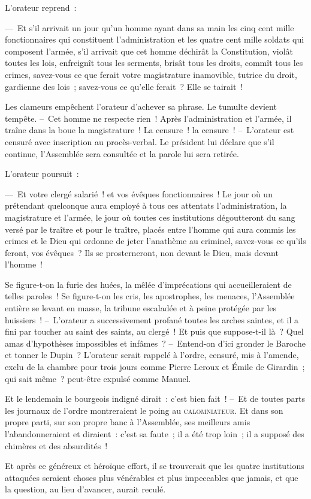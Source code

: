 \documentclass[french,twoside]{book} %
\begin{document}
L’orateur reprend :\par
— Et s’il arrivait un jour qu’un homme ayant dans sa main les cinq cent mille fonctionnaires qui constituent l’administration et les quatre cent mille soldats qui composent l’armée, s’il arrivait que cet homme déchirât la Constitution, violât toutes les lois, enfreignît tous les serments, brisât tous les droits, commît tous les crimes, savez-vous ce que ferait votre magistrature inamovible, tutrice du droit, gardienne des lois ; savez-vous ce qu’elle ferait ? Elle se tairait !\par
Les clameurs empêchent l’orateur d’achever sa phrase. Le tumulte devient tempête. – Cet homme ne respecte rien ! Après l’administration et l’armée, il traîne dans la boue la magistrature ! La censure ! la censure ! – L’orateur est censuré avec inscription au procès-verbal. Le président lui déclare que s’il continue, l’Assemblée sera consultée et la parole lui sera retirée.\par
L’orateur poursuit :\par
— Et votre clergé salarié ! et vos évêques fonctionnaires ! Le jour où un prétendant quelconque aura employé à tous ces attentats l’administration, la magistrature et l’armée, le jour où toutes ces institutions dégoutteront du sang versé par le traître et pour le traître, placés entre l’homme qui aura commis les crimes et le Dieu qui ordonne de jeter l’anathème au criminel, savez-vous ce qu’ils feront, vos évêques ? Ils se prosterneront, non devant le Dieu, mais devant l’homme !\par
Se figure-t-on la furie des huées, la mêlée d’imprécations qui accueilleraient de telles paroles ! Se figure-t-on les cris, les apostrophes, les menaces, l’Assemblée entière se levant en masse, la tribune escaladée et à peine protégée par les huissiers ! – L’orateur a successivement profané toutes les arches saintes, et il a fini par toucher au saint des saints, au clergé ! Et puis que suppose-t-il là ? Quel amas d’hypothèses impossibles et infâmes ? – Entend-on d’ici gronder le Baroche et tonner le Dupin ? L’orateur serait rappelé à l’ordre, censuré, mis à l’amende, exclu de la chambre pour trois jours comme Pierre Leroux et Émile de Girardin ; qui sait même ? peut-être expulsé comme Manuel.\par
Et le lendemain le bourgeois indigné dirait : c’est bien fait ! – Et de toutes parts les journaux de l’ordre montreraient le poing au {\scshape calomniateur}. Et dans son propre parti, sur son propre banc à l’Assemblée, ses meilleurs amis l’abandonneraient et diraient : c’est sa faute ; il a été trop loin ; il a supposé des chimères et des absurdités !\par
Et après ce généreux et héroïque effort, il se trouverait que les quatre institutions attaquées seraient choses plus vénérables et plus impeccables que jamais, et que la question, au lieu d’avancer, aurait reculé.
\end{document}
